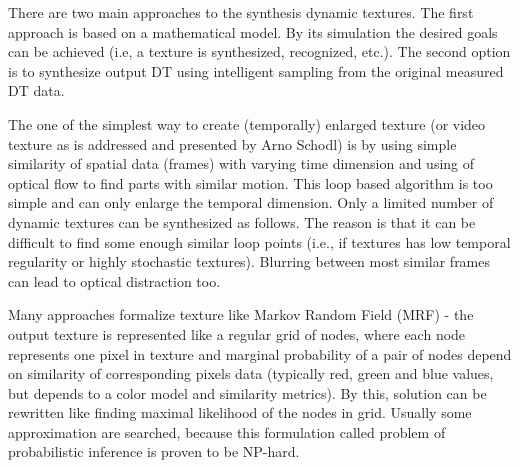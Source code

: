 

		There are two main approaches to the synthesis dynamic textures. The first  approach is based on  a mathematical model. By its simulation the desired goals can be achieved (i.e, a texture is synthesized, recognized, etc.). The second option is to synthesize output DT using intelligent sampling from the original measured DT data.

 		The one of the simplest way to create (temporally) enlarged texture (or video texture as is addressed\cite{Schodl00videotextures} and presented by Arno Schodl) is by using simple similarity of spatial data (frames) with varying time dimension and using of optical flow to find parts with similar motion\cite{Schodl00videotextures}. This loop based algorithm is too simple and can only enlarge the temporal dimension. Only a limited number of dynamic textures can be synthesized as follows. The reason is that it can be difficult to find some enough similar loop points (i.e., if textures has low temporal regularity or highly stochastic textures). Blurring between most similar frames can lead to optical distraction too.

		
		Many approaches \cite{Bonet98multiresolutionsampling,Lin07alattice-based,Lin05alattice-based,Efros01imagequilting,Wei00fasttexture} formalize texture like Markov Random Field (MRF) - the output texture is represented like a regular grid of nodes, where each node represents one pixel in texture and marginal probability of a pair of nodes depend on similarity of corresponding pixels data (typically red, green and blue values, but depends to a color model and similarity metrics). By this, solution can be rewritten like finding maximal likelihood of the nodes in grid. Usually some approximation are searched, because this formulation called problem of probabilistic inference is proven to be NP-hard.
	
